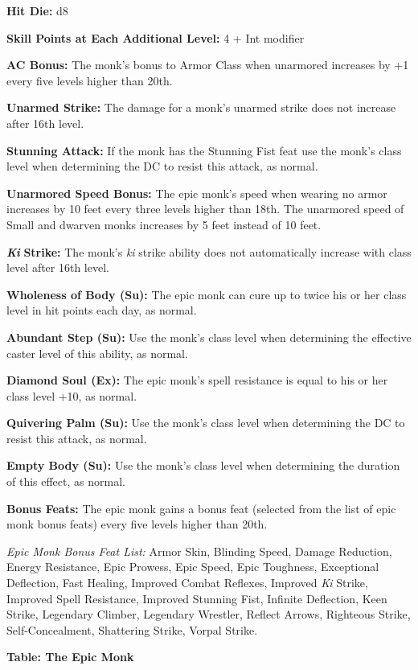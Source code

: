 \documentclass{article}
\begin{document}
\textbf{Hit Die:} d8

\textbf{Skill Points at Each Additional Level:} 4 + Int modifier

\textbf{AC Bonus:} The monk's bonus to Armor Class when unarmored increases by 
+1 every five levels higher than 20th. 

\textbf{Unarmed Strike:} The damage for a monk's unarmed strike does not increase 
after 16th level. 

\textbf{Stunning Attack: }If the monk has the Stunning Fist feat use the monk's 
class level when determining the DC to resist this attack, as normal. 

\textbf{Unarmored Speed Bonus:} The epic monk's speed when wearing no armor increases 
by 10 feet every three levels higher than 18th. The unarmored speed of Small and 
dwarven monks increases by 5 feet instead of 10 feet.

\textit{\textbf{Ki }}\textbf{Strike:} The monk's \textit{ki }strike ability does 
not automatically increase with class level after 16th level. 

\textbf{Wholeness of Body (Su):} The epic monk can cure up to twice his or her 
class level in hit points each day, as normal. 

\textbf{Abundant Step (Su):} Use the monk's class level when determining the effective 
caster level of this ability, as normal. 

\textbf{Diamond Soul (Ex):} The epic monk's spell resistance is equal to his or 
her class level +10, as normal. 

\textbf{Quivering Palm (Su):} Use the monk's class level when determining the DC 
to resist this attack, as normal. 

\textbf{Empty Body (Su):} Use the monk's class level when determining the duration 
of this effect, as normal. 

\textbf{Bonus Feats:} The epic monk gains a bonus feat (selected from the list 
of epic monk bonus feats) every five levels higher than 20th. 

\textit{Epic Monk Bonus Feat List: }Armor Skin, Blinding Speed, Damage Reduction, 
Energy Resistance, Epic Prowess, Epic Speed, Epic Toughness, Exceptional Deflection, 
Fast Healing, Improved Combat Reflexes, Improved \textit{Ki }Strike, Improved Spell 
Resistance, Improved Stunning Fist, Infinite Deflection, Keen Strike, Legendary 
Climber, Legendary Wrestler, Reflect Arrows, Righteous Strike, Self-Concealment, 
Shattering Strike, Vorpal Strike. 

\textbf{Table: The Epic Monk }
\end{document}
